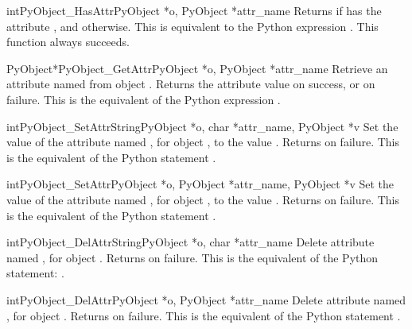 \documentclass{manual}
\begin{document}
\begin{cfuncdesc}{int}{PyObject_HasAttr}{PyObject *o, PyObject *attr_name}
Returns  if  has the attribute , and
 otherwise.  This is equivalent to the Python expression
. 
This function always succeeds.
\end{cfuncdesc}


\begin{cfuncdesc}{PyObject*}{PyObject_GetAttr}{PyObject *o,
                                               PyObject *attr_name}
Retrieve an attribute named  from object .
Returns the attribute value on success, or \NULL{} on failure.
This is the equivalent of the Python expression
.
\end{cfuncdesc}


\begin{cfuncdesc}{int}{PyObject_SetAttrString}{PyObject *o,
                                               char *attr_name, PyObject *v}
Set the value of the attribute named , for object
, to the value . Returns  on failure.  This is
the equivalent of the Python statement .
\end{cfuncdesc}


\begin{cfuncdesc}{int}{PyObject_SetAttr}{PyObject *o,
                                         PyObject *attr_name, PyObject *v}
Set the value of the attribute named , for
object ,
to the value . Returns  on failure.  This is
the equivalent of the Python statement .
\end{cfuncdesc}


\begin{cfuncdesc}{int}{PyObject_DelAttrString}{PyObject *o, char *attr_name}
Delete attribute named , for object . Returns
 on failure.  This is the equivalent of the Python
statement: .
\end{cfuncdesc}


\begin{cfuncdesc}{int}{PyObject_DelAttr}{PyObject *o, PyObject *attr_name}
Delete attribute named , for object . Returns
 on failure.  This is the equivalent of the Python
statement .
\end{cfuncdesc}
\end{document}

